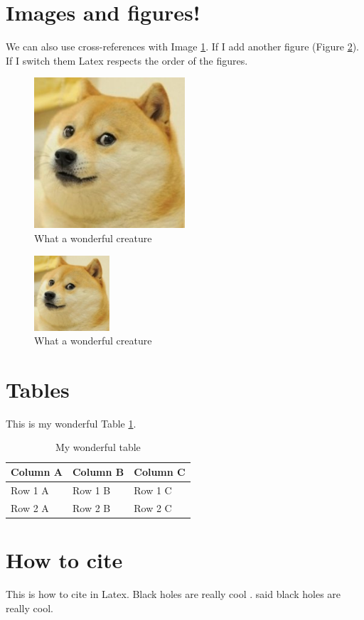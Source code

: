 \documentclass[12pt]{article}
\begin{document}
\section{Images and figures!}

We can also use cross-references with Image \ref{fig:my_label}. If I add another figure (Figure \ref{fig2:my_label}). If I switch them Latex respects the order of the figures.

\begin{figure}[h]
    \centering
    \includegraphics[width = 0.5\textwidth]{dog.jpg}
    \caption{What a wonderful creature}
    \label{fig:my_label}
\end{figure}

\begin{figure}[h]
    \centering
    \includegraphics[width = 0.25\textwidth]{dog.jpg}
    \caption{What a wonderful creature}
    \label{fig2:my_label}
\end{figure}

\newpage
\section{Tables}

This is my wonderful Table \ref{table1}.

\begin{table}[h]
\centering
\caption{My wonderful table}
\begin{tabular}{lll}
\textbf{Column A} & \textbf{Column B} & \textbf{Column C} \\ \hline
Row 1 A           & Row 1 B           & Row 1 C           \\
Row 2 A           & Row 2 B           & Row 2 C           \\ \hline
\end{tabular}
\label{table1}
\end{table}

\section{How to cite}

This is how to cite in Latex. Black holes are really cool \citep{hawking1974black}. \citet{hawking1974black} said black holes are really cool.


\end{document}
